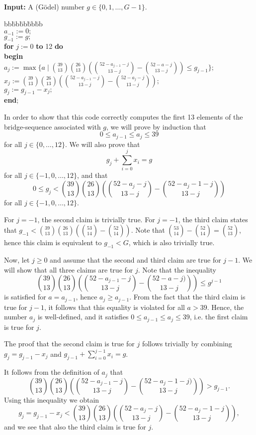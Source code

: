 {\bf Input:} A (G\"odel) number $g\in\{0,1,\ldots,G-1\}$.
\begin{tabbing}
bb\=bb\=bb\=bb\=bb \kill \\
$a_{-1} := 0;$ \\
$g_{-1} := g;$ \\
{\bf for} $j := 0$ {\bf to} 12 {\bf do} \\
{\bf begin} \\
\>
$a_j :=\displaystyle  \max\{a \mid
{39\choose 13} {26\choose 13} ({52-a_{j-1}-j \choose 13-j} - {52-a-j \choose
13-j}) \leq g_{j-1} \};$ \\
\>
$x_j := \displaystyle
{39\choose 13} {26\choose 13} ({52-a_{j-1}-j \choose 13-j} - {52-a_j-j \choose
13-j});$ \\
\> $g_j := g_{j-1} - x_j;$\\
{\bf end};
\end{tabbing}

In order to show that this code correctly computes the first
13 elements of the bridge-sequence associated with $g$, we
will prove by induction that $$0\leq a_{j-1} \leq a_j \leq 39$$
for all $j\in\{0,\ldots,12\}$. We will also prove that
$$g_j + \sum_{i=0}^j x_i = g$$ for all $j\in \{-1,0,\ldots,12\}$,
and that $$\displaystyle 0\leq g_j < {39\choose 13}{26\choose 13}
({52-a_j-j\choose 13-j} - {52-a_j-1-j\choose 13-j})$$
for all $j\in \{-1,0,\ldots,12\}$.

For $j=-1$, the second claim is trivially true.
For $j=-1$, the third claim states that
$g_{-1} < {39\choose 13}{26\choose 13} ({53\choose 14} - {52\choose 14})$.
Note that ${53\choose 14} - {52\choose 14} = {52\choose 13}$, hence this
claim is equivalent to $g_{-1} < G$, which is also trivially true.

Now, let $j\geq 0$ and assume that the second and third claim are true for
$j-1$. We will show that all three claims are true for $j$.
Note that the inequality
$$ {39\choose 13} {26\choose 13} ({52-a_{j-1} - j
\choose 13-j} - {52-a-j) \choose 13-j}) \leq g^{j-1}$$ is satisfied for
$a = a_{j-1}$, hence $a_j\geq a_{j-1}$. From the fact that the third
claim is true for $j-1$, it follows that this equality is violated
for all $a>39$. Hence, the number $a_j$ is well-defined, and it satisfies
$0\leq a_{j-1} \leq a_j \leq 39$, i.e. the first claim is true for $j$.

The proof that the second claim is true for $j$ follows trivially
by combining $g_j = g_{j-1} - x_j$ and $g_{j-1} + \sum_{i=0}^{j-1} x_i = g$.

It follows from the definition of $a_j$ that
$${39\choose 13}{26\choose 13} ({52-a_{j-1}-j\choose 13-j} -
{52-a_j-1-j)\choose 13-j}) > g_{j-1}.$$
Using this inequality we obtain
$$g_j = g_{j-1} - x_j <
{39\choose 13}{26\choose 13}
({52-a_j-j\choose 13-j} - {52-a_j-1-j\choose 13-j}),$$
and we see that also the third claim is true for $j$.

